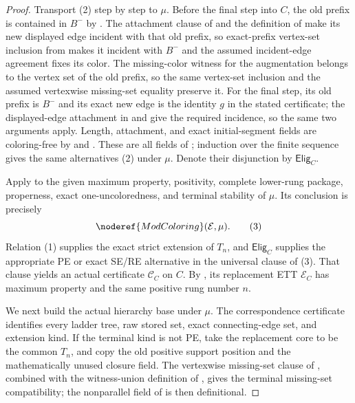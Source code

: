 \begin{proof}
Transport (2) step by step to $\mu$.  Before the final step into $C$,
the old prefix is contained in $B^-$ by
.  The attachment clause of
 and the definition of 
make its new displayed edge incident with that old prefix, so exact-prefix
vertex-set inclusion from  makes it incident
with $B^-$ and the assumed incident-edge agreement fixes its color.  The
missing-color witness for the augmentation belongs to the vertex set of
the old prefix, so the same vertex-set inclusion and the assumed
vertexwise missing-set equality preserve it.  For the final step, its old
prefix is $B^-$ and its exact new edge is the identity $g$ in the stated
 certificate; the displayed-edge
attachment in  and  give
the required incidence, so the same two arguments apply.  Length,
attachment, and exact initial-segment fields are coloring-free by
 and .  These
are all fields of
; induction over the finite sequence gives
the same alternatives (2) under $\mu$.  Denote their disjunction by
$\mathsf{Elig}_C$.

Apply  to the given maximum property, positivity, complete
lower-rung package, properness, exact one-uncoloredness, and terminal
stability of $\mu$.  Its conclusion is precisely
\[
                         \noderef{ModColoring}(\mathcal E,\mu).\tag{3}
\]
Relation (1) supplies the exact strict extension of $T_n$, and
$\mathsf{Elig}_C$ supplies the appropriate PE or exact SE/RE alternative
in the universal clause of (3).  That clause yields an actual
 certificate
$\mathcal C_C$ on $C$.  By , its
replacement ETT $\mathcal E_C$ has maximum property and the same positive
rung number $n$.

We next build the actual hierarchy base under $\mu$.  The correspondence
certificate identifies every ladder tree, raw stored set, exact
connecting-edge set, and extension kind.  If the terminal kind is not PE,
take the replacement core to be the common $T_n$, and copy the old
positive support position and the mathematically unused closure field.
The vertexwise missing-set clause of , combined
with the witness-union definition of , gives
the terminal missing-set compatibility; the nonparallel field of
 is then definitional.


\end{proof}
